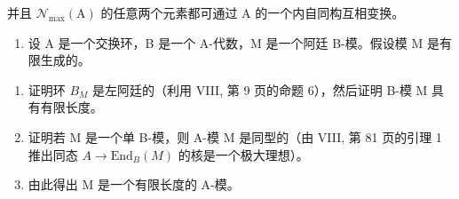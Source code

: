 并且 \(\mathcal{N}_{\mathrm{max}}(\mathrm{A})\) 的任意两个元素都可通过 A 的一个内自同构互相变换。

\begin{enumerate}
\def\labelenumi{\arabic{enumi})}
\setcounter{enumi}{10}
\tightlist
\item
  设 A 是一个交换环，B 是一个 A-代数，M 是一个阿廷 B-模。假设模 M 是有限生成的。
\end{enumerate}

\begin{enumerate}
\def\labelenumi{\alph{enumi})}
\item
  证明环 \(B_{M}\) 是左阿廷的（利用 VIII, 第 9 页的命题 6），然后证明 B-模 M 具有有限长度。
\item
  证明若 M 是一个单 B-模，则 A-模 M 是同型的（由 VIII, 第 81 页的引理 1 推出同态 \(A \rightarrow \text{End}_{B}(M)\) 的核是一个极大理想）。
\item
  由此得出 M 是一个有限长度的 A-模。
\end{enumerate}

